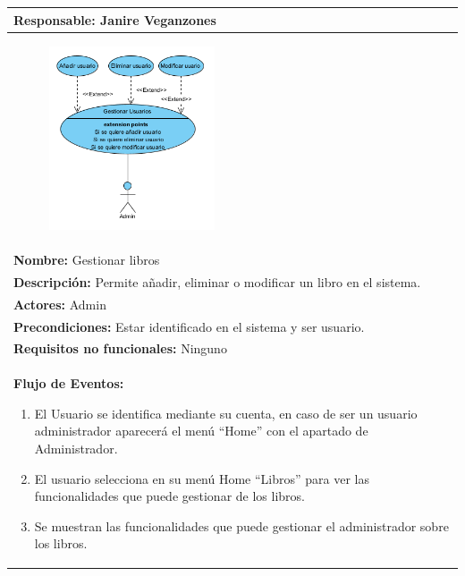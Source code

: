 \documentclass{report}
\begin{document}
        \begin{longtable}{|p{\linewidth}|}
                \hline
                \textbf{Responsable:} Janire Veganzones\\
                \hline
                \begin{figure}[H]
                    \centering
                    \includegraphics[width=0.45\textwidth]{./img/casos_uso/CasoDeUsoGestionUsu.png}
                \end{figure}\\
                \hline
                \textbf{Nombre:} Gestionar libros\\
                \hline
                \textbf{Descripción:}  Permite añadir, eliminar o modificar un libro en el sistema.\\
                \hline
                \textbf{Actores:} Admin\\
                \hline
                \textbf{Precondiciones:} Estar identificado en el sistema y ser usuario.\\
                \hline
                \textbf{Requisitos no funcionales:} Ninguno\\
                \hline
                \textbf{Flujo de Eventos:}
                \begin{enumerate}
                    \item El Usuario se identifica mediante su cuenta, en caso de ser un usuario administrador aparecerá el menú “Home” con el apartado de Administrador.
                    \item El usuario selecciona en su menú Home “Libros” para ver las funcionalidades que puede gestionar de los libros.
                    \item Se muestran las funcionalidades que puede gestionar el administrador sobre los libros.
                    \newline

\end{enumerate}
\end{longtable}
\end{document}
